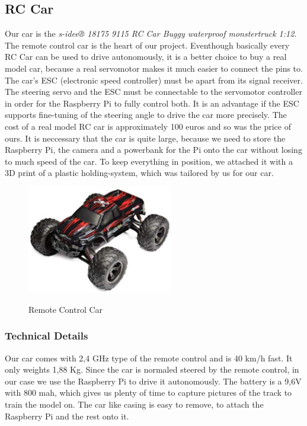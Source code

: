 \documentclass[journal]{IEEEtran}
\begin{document}
\subsection{RC Car}
Our car is the \textit{s-idee® 18175 9115 RC Car Buggy waterproof monstertruck 1:12}.
The remote control car is the heart of our project. Eventhough basically every RC Car can be used to drive autonomously, it is a better choice to buy a real model car, because a real servomotor makes it much easier to connect the pins to. The car’s ESC (electronic speed controller) must be apart from its signal receiver.
The steering servo and the ESC must be connectable to the servomotor controller in order for the Raspberry Pi to fully control both. It is an advantage if the ESC supports fine-tuning of the steering angle to drive the car more precisely. 
The cost of a real model RC car is approximately 100 euros and so was the price of ours. It is neccessary that the car is quite large, because we need to store the Raspberry Pi, the camera and a powerbank for the Pi onto the car without losing to much speed of the car. To keep everything in position, we attached it with a 3D print of a plastic holding-system, which was tailored by us for our car. \\

\begin{figure}
  \begin{center}
  \includegraphics[width=2.5in]{photo/car.jpg}\\
  \caption{Remote Control Car}\label{car}
  \end{center}
\end{figure}

\subsubsection{Technical Details}
Our car comes with 2,4 GHz type of the remote control and is 40 km/h fast. It only weights 1,88 Kg. Since the car is normaled steered by the remote control, in our case we use the Raspberry Pi to drive it autonomously. The battery is a 9,6V with 800 mah, which gives us plenty of time to capture pictures of the track to train the model on. The car like casing is easy to remove, to attach the Raspberry Pi and the rest onto it.
\end{document}
